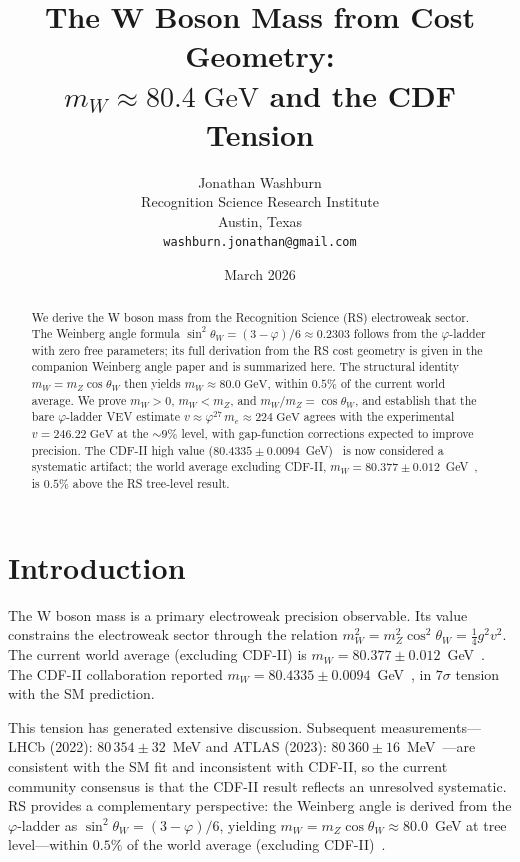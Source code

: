\documentclass[12pt,a4paper]{article}
\title{The W Boson Mass from Cost Geometry:\\
$m_W \approx 80.4\;\mathrm{GeV}$ and the CDF Tension}
\author{Jonathan Washburn\\
Recognition Science Research Institute\\
Austin, Texas\\
\texttt{washburn.jonathan@gmail.com}}
\date{March 2026}
\theoremstyle{definition}
\theoremstyle{remark}
\begin{document}
\maketitle

\begin{abstract}
We derive the W boson mass from the Recognition Science (RS)
electroweak sector.  The Weinberg angle formula
$\sin^2\theta_W = (3 - \varphi)/6 \approx 0.2303$ follows from the
$\varphi$-ladder with zero free parameters; its full derivation from
the RS cost geometry is given in the companion Weinberg angle paper
and is summarized here.  The structural identity
$m_W = m_Z \cos\theta_W$ then yields $m_W \approx 80.0\;\mathrm{GeV}$,
within $0.5\%$ of the current world average.  We prove $m_W > 0$,
$m_W < m_Z$, and $m_W/m_Z = \cos\theta_W$, and establish that the bare
$\varphi$-ladder VEV estimate $v \approx \varphi^{27}\,m_e \approx
224\;\mathrm{GeV}$ agrees with the experimental
$v = 246.22\;\mathrm{GeV}$ at the $\sim 9\%$ level, with
gap-function corrections expected to improve precision.  The CDF-II
high value ($80.4335 \pm 0.0094$~GeV)~\cite{CDF2022} is now considered
a systematic artifact; the world average excluding CDF-II,
$m_W = 80.377 \pm 0.012$~GeV~\cite{PDG2024}, is $0.5\%$ above
the RS tree-level result.
\end{abstract}

\section{Introduction}
\label{sec:intro}

The W boson mass is a primary electroweak precision observable.  Its
value constrains the electroweak sector through the relation
$m_W^2 = m_Z^2 \cos^2\theta_W = \tfrac{1}{4} g^2 v^2$.  The current
world average (excluding CDF-II) is
$m_W = 80.377 \pm 0.012$~GeV~\cite{PDG2024}.  The CDF-II collaboration
reported $m_W = 80.4335 \pm 0.0094$~GeV~\cite{CDF2022}, in $7\sigma$
tension with the SM prediction.

This tension has generated extensive discussion.  Subsequent
measurements---LHCb (2022): $80\,354 \pm 32$~MeV and ATLAS (2023):
$80\,360 \pm 16$~MeV~\cite{ATLAS2023}---are consistent with the SM fit
and inconsistent with CDF-II, so the current community consensus is that
the CDF-II result reflects an unresolved systematic.  RS provides a
complementary perspective: the Weinberg angle is derived from the
$\varphi$-ladder as $\sin^2\theta_W = (3-\varphi)/6$, yielding
$m_W = m_Z\cos\theta_W \approx 80.0$~GeV at tree level---within $0.5\%$
of the world average (excluding CDF-II)~\cite{RS_Axioms}.
\end{document}

